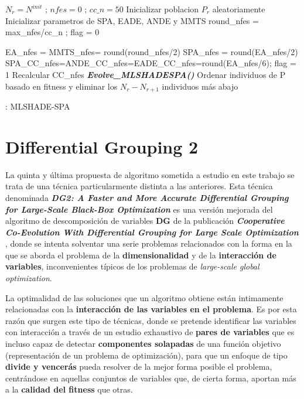 \begin{algorithm}[H]
	\begin{algorithmic}[1]
		\STATE $N_r = N^{init}$ ; $nfes = 0$ ; $cc\_n = 50$
		\STATE Inicializar poblacion $P_r$ aleatoriamente
		\STATE Inicializar parametros de SPA, EADE, ANDE y MMTS
		\STATE round\_nfes = max\_nfes/cc\_n ; flag = 0
		
		\STATE EA\_nfes = MMTS\_nfes=  round(round\_nfes/2)
		\STATE SPA\_nfes = round(EA\_nfes/2)
		\STATE SPA\_CC\_nfes=ANDE\_CC\_nfes=EADE\_CC\_nfes=round(EA\_nfes/6); flag = 1
		\ELSE 
		\STATE Recalcular CC\_nfes
		\ENDIF	
		\STATE\textit{ \textbf{Evolve\_MLSHADESPA()}}
		\STATE 	Ordenar individuos de P basado en fitness y eliminar los $N_r - N_{r+1}$ individuos más abajo
		\ENDIF
		\ENDWHILE		
	\end{algorithmic}
	\caption{: MLSHADE-SPA} \label{Alg: MLSHADE-SPA}
\end{algorithm}

\section{Differential Grouping 2}

La quinta y última propuesta de algoritmo sometida a estudio en este trabajo se trata de una técnica particularmente distinta a las anteriores. Esta técnica denominada \textbf{\textit{DG2: A Faster and More Accurate Differential Grouping for Large-Scale Black-Box Optimization}}\cite{DG2} es una versión mejorada del algoritmo de descomposición de variables \textbf{DG} de la publicación \textbf{\textit{Cooperative Co-Evolution With Differential Grouping for Large Scale Optimization}} \cite{DG}, donde se intenta solventar una serie problemas relacionados con la forma en la que se aborda el problema de la \textbf{dimensionalidad} y de la \textbf{interacción de variables}, inconvenientes típicos de los problemas de \textit{large-scale global optimization}.

La optimalidad de las soluciones que un algoritmo obtiene están intimamente relacionadas con la \textbf{interacción de las variables en el problema}. Es por esta razón que surgen este tipo de técnicas, donde se pretende identificar las variables con interacción a través de un estudio exhaustivo de \textbf{pares de variables} que es incluso capaz de detectar \textbf{componentes solapadas} de una función objetivo (representación de un problema de optimización), para que un enfoque de tipo \textbf{divide y vencerás} pueda resolver de la mejor forma posible el problema, centrándose en aquellas conjuntos de variables que, de cierta forma, aportan más a la \textbf{calidad del fitness} que otras.

